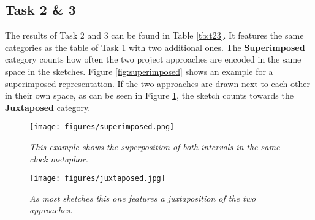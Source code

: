 \begin{table}[h]
	\centering
	\caption{\textit{This table shows the results of the first task of the Drawing Study. The first row of numbers shows the respective counts of every category. The \textbf{Explicit...} category is further split up into its four sub-categories and their respective counts.}}
	\label{tb:t1}
\end{table}


\subsection*{Task 2 \& 3}
The results of Task 2 and 3 can be found in Table \ref{tb:t23}. It features the same categories as the table of Task 1 with two additional ones. The \textbf{Superimposed} category counts how often the two project approaches are encoded in the same space in the sketches. Figure \ref{fig:superimposed} shows an example for a superimposed representation. If the two approaches are drawn next to each other in their own space, as can be seen in Figure \ref{fig:juxtaposed}, the sketch counts towards the \textbf{Juxtaposed} category.

	\begin{figure}[H]
		\begin{minipage}{.55\textwidth}
			\centering
			\captionsetup{width=0.8\textwidth}
			\texttt{[image: figures/superimposed.png]}
			\caption{\textit{This example shows the superposition of both intervals in the same clock metaphor.}}
			\label{fig:superimposed}
		\end{minipage}
		\begin{minipage}{.5\textwidth}
			\centering
			\captionsetup{width=1.0\textwidth}
			\texttt{[image: figures/juxtaposed.jpg]}
			\caption{\textit{As most sketches this one features a juxtaposition of the two approaches.}}
			\label{fig:juxtaposed}
		\end{minipage}
	\end{figure}

